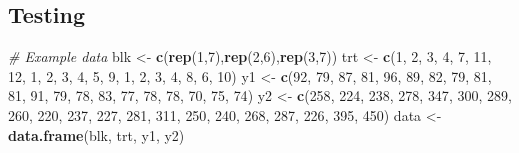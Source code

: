 \documentclass[]{article}
\newenvironment{Shaded}{\begin{snugshade}}{\end{snugshade}}
\newcommand{\CommentTok}[1]{\textcolor[rgb]{0.56,0.35,0.01}{\textit{#1}}}
\newcommand{\DecValTok}[1]{\textcolor[rgb]{0.00,0.00,0.81}{#1}}
\newcommand{\KeywordTok}[1]{\textcolor[rgb]{0.13,0.29,0.53}{\textbf{#1}}}
\newcommand{\NormalTok}[1]{#1}
\newcommand{\StringTok}[1]{\textcolor[rgb]{0.31,0.60,0.02}{#1}}
\begin{document}
\hypertarget{testing}{%
\subsection{Testing}\label{testing}}

\begin{Shaded}
\begin{Highlighting}[]
\CommentTok{# Example data}
\NormalTok{blk <-}\StringTok{ }\KeywordTok{c}\NormalTok{(}\KeywordTok{rep}\NormalTok{(}\DecValTok{1}\NormalTok{,}\DecValTok{7}\NormalTok{),}\KeywordTok{rep}\NormalTok{(}\DecValTok{2}\NormalTok{,}\DecValTok{6}\NormalTok{),}\KeywordTok{rep}\NormalTok{(}\DecValTok{3}\NormalTok{,}\DecValTok{7}\NormalTok{))}
\NormalTok{trt <-}\StringTok{ }\KeywordTok{c}\NormalTok{(}\DecValTok{1}\NormalTok{, }\DecValTok{2}\NormalTok{, }\DecValTok{3}\NormalTok{, }\DecValTok{4}\NormalTok{, }\DecValTok{7}\NormalTok{, }\DecValTok{11}\NormalTok{, }\DecValTok{12}\NormalTok{, }\DecValTok{1}\NormalTok{, }\DecValTok{2}\NormalTok{, }\DecValTok{3}\NormalTok{, }\DecValTok{4}\NormalTok{, }\DecValTok{5}\NormalTok{, }\DecValTok{9}\NormalTok{, }\DecValTok{1}\NormalTok{, }\DecValTok{2}\NormalTok{, }\DecValTok{3}\NormalTok{, }\DecValTok{4}\NormalTok{, }\DecValTok{8}\NormalTok{, }\DecValTok{6}\NormalTok{, }\DecValTok{10}\NormalTok{)}
\NormalTok{y1 <-}\StringTok{ }\KeywordTok{c}\NormalTok{(}\DecValTok{92}\NormalTok{, }\DecValTok{79}\NormalTok{, }\DecValTok{87}\NormalTok{, }\DecValTok{81}\NormalTok{, }\DecValTok{96}\NormalTok{, }\DecValTok{89}\NormalTok{, }\DecValTok{82}\NormalTok{, }\DecValTok{79}\NormalTok{, }\DecValTok{81}\NormalTok{, }\DecValTok{81}\NormalTok{, }\DecValTok{91}\NormalTok{, }\DecValTok{79}\NormalTok{, }\DecValTok{78}\NormalTok{, }\DecValTok{83}\NormalTok{, }\DecValTok{77}\NormalTok{, }\DecValTok{78}\NormalTok{, }\DecValTok{78}\NormalTok{,}
\DecValTok{70}\NormalTok{, }\DecValTok{75}\NormalTok{, }\DecValTok{74}\NormalTok{)}
\NormalTok{y2 <-}\StringTok{ }\KeywordTok{c}\NormalTok{(}\DecValTok{258}\NormalTok{, }\DecValTok{224}\NormalTok{, }\DecValTok{238}\NormalTok{, }\DecValTok{278}\NormalTok{, }\DecValTok{347}\NormalTok{, }\DecValTok{300}\NormalTok{, }\DecValTok{289}\NormalTok{, }\DecValTok{260}\NormalTok{, }\DecValTok{220}\NormalTok{, }\DecValTok{237}\NormalTok{, }\DecValTok{227}\NormalTok{, }\DecValTok{281}\NormalTok{, }\DecValTok{311}\NormalTok{, }\DecValTok{250}\NormalTok{,}
\DecValTok{240}\NormalTok{, }\DecValTok{268}\NormalTok{, }\DecValTok{287}\NormalTok{, }\DecValTok{226}\NormalTok{, }\DecValTok{395}\NormalTok{, }\DecValTok{450}\NormalTok{)}
\NormalTok{data <-}\StringTok{ }\KeywordTok{data.frame}\NormalTok{(blk, trt, y1, y2)}

\end{Highlighting}
\end{Shaded}
\end{document}
